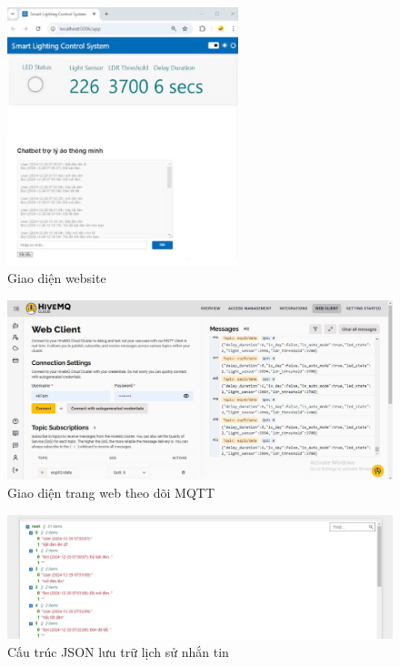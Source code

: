{\begin{figure}[H]
    \centering
    \includegraphics[width=0.6\textwidth]{img/UI.jpg}
    \caption{Giao diện website}
    \label{fig:website}
\end{figure}

\begin{figure}[H]
    \centering
    \includegraphics[width=\textwidth]{img/MQTT.jpg}
    \caption{Giao diện trang web theo dõi MQTT}
    \label{fig:mqtt}
\end{figure}

\begin{figure}[H]
    \centering
    \includegraphics[width=\textwidth]{img/chat-history.jpg}
    \caption{Cấu trúc JSON lưu trữ lịch sử nhắn tin}
    \label{fig:mqtt}
\end{figure}

}
